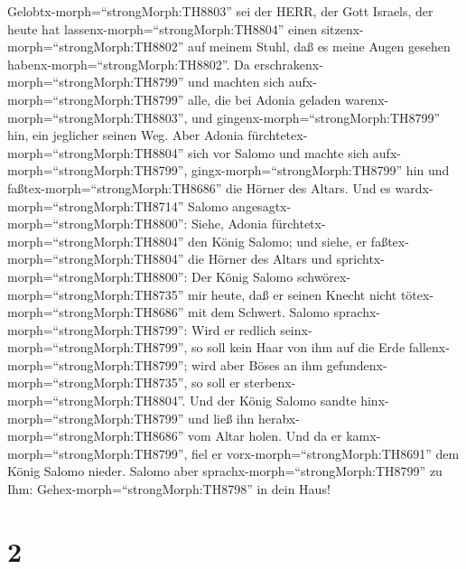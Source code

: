 Gelobtx-morph=``strongMorph:TH8803'' sei der HERR, der Gott Israels, der
heute hat lassenx-morph=``strongMorph:TH8804'' einen
sitzenx-morph=``strongMorph:TH8802'' auf meinem Stuhl, daß es meine
Augen gesehen habenx-morph=``strongMorph:TH8802''.  Da
erschrakenx-morph=``strongMorph:TH8799'' und machten sich
aufx-morph=``strongMorph:TH8799'' alle, die bei Adonia geladen
warenx-morph=``strongMorph:TH8803'', und
gingenx-morph=``strongMorph:TH8799'' hin, ein jeglicher seinen Weg.
 Aber Adonia fürchtetex-morph=``strongMorph:TH8804'' sich
vor Salomo und machte sich aufx-morph=``strongMorph:TH8799'',
gingx-morph=``strongMorph:TH8799'' hin und
faßtex-morph=``strongMorph:TH8686'' die Hörner des Altars. 
Und es wardx-morph=``strongMorph:TH8714'' Salomo
angesagtx-morph=``strongMorph:TH8800'': Siehe, Adonia
fürchtetx-morph=``strongMorph:TH8804'' den König Salomo; und siehe, er
faßtex-morph=``strongMorph:TH8804'' die Hörner des Altars und
sprichtx-morph=``strongMorph:TH8800'': Der König Salomo
schwörex-morph=``strongMorph:TH8735'' mir heute, daß er seinen Knecht
nicht tötex-morph=``strongMorph:TH8686'' mit dem Schwert. 
Salomo sprachx-morph=``strongMorph:TH8799'': Wird er redlich
seinx-morph=``strongMorph:TH8799'', so soll kein Haar von ihm auf die
Erde fallenx-morph=``strongMorph:TH8799''; wird aber Böses an ihm
gefundenx-morph=``strongMorph:TH8735'', so soll er
sterbenx-morph=``strongMorph:TH8804''.  Und der König
Salomo sandte hinx-morph=``strongMorph:TH8799'' und ließ ihn
herabx-morph=``strongMorph:TH8686'' vom Altar holen. Und da er
kamx-morph=``strongMorph:TH8799'', fiel er
vorx-morph=``strongMorph:TH8691'' dem König Salomo nieder. Salomo aber
sprachx-morph=``strongMorph:TH8799'' zu Ihm:
Gehex-morph=``strongMorph:TH8798'' in dein Haus!

\hypertarget{section-1}{%
\section{2}\label{section-1}}

